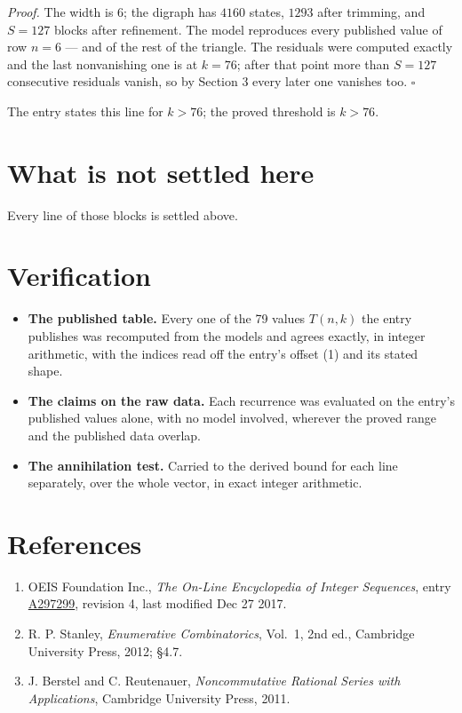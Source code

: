 \documentclass[11pt]{article}
\theoremstyle{definition}
\begin{document}
{\itshape Proof.} The width is $6$; the digraph has $4160$ states, $1293$ after trimming, and $S = 127$ blocks after refinement. The model reproduces every published value of row $n = 6$ --- and of the rest of the triangle. The residuals were computed exactly and the last nonvanishing one is at $k = 76$; after that point more than $S = 127$ consecutive residuals vanish, so by Section 3 every later one vanishes too. $\square$

The entry states this line for $k > 76$; the proved threshold is $k > 76$.

\section{What is not settled here}

Every line of those blocks is settled above.

\section{Verification}

\begin{itemize}

\item {\bfseries The published table.} Every one of the 79 values $T(n,k)$ the entry publishes was recomputed from the models and agrees exactly, in integer arithmetic, with the indices read off the entry's offset (1) and its stated shape.

\item {\bfseries The claims on the raw data.} Each recurrence was evaluated on the entry's published values alone, with no model involved, wherever the proved range and the published data overlap.

\item {\bfseries The annihilation test.} Carried to the derived bound for each line separately, over the whole vector, in exact integer arithmetic.

\end{itemize}

\section{References}

\begin{enumerate}

\item OEIS Foundation Inc., \emph{The On-Line Encyclopedia of Integer Sequences}, entry \href{https://oeis.org/A297299}{A297299}, revision 4, last modified Dec 27 2017.

\item R. P. Stanley, \emph{Enumerative Combinatorics}, Vol.~1, 2nd ed., Cambridge University Press, 2012; \S4.7.

\item J. Berstel and C. Reutenauer, \emph{Noncommutative Rational Series with Applications}, Cambridge University Press, 2011.

\end{enumerate}
\end{document}
